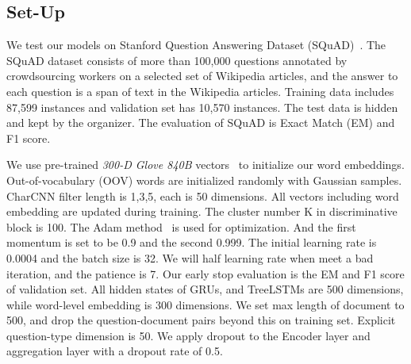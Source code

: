 \documentclass{article}
\begin{document}
\subsection{Set-Up}
We test our models on Stanford Question Answering Dataset (SQuAD)~\citep{rajpurkar2016squad}. The SQuAD dataset consists of more than 100,000 questions annotated by crowdsourcing workers on a selected set of Wikipedia articles, and the answer to each question is a span of text in the  Wikipedia articles. Training data includes 87,599 instances and validation set has 10,570 instances. The test data is hidden and kept by the organizer. The evaluation of SQuAD is Exact Match (EM) and F1 score.


We use pre-trained \textit{300-D Glove 840B} vectors~\citep{pennington2014glove} to initialize our word embeddings. Out-of-vocabulary (OOV) words are initialized randomly with Gaussian samples. CharCNN filter length is 1,3,5, each is 50 dimensions. All vectors including word embedding are updated during training. The cluster number K in discriminative block is 100. The Adam method~\citep{Kingma2014AdamAM} is used for optimization. And the first momentum is set to be 0.9 and the second 0.999. The initial learning rate is 0.0004 and the batch size is 32. We will half learning rate when meet a bad iteration, and the patience is 7. Our early stop evaluation is the EM and F1 score of validation set. All hidden states of GRUs, and TreeLSTMs are 500 dimensions, while word-level embedding  is 300 dimensions. We set max length of document to 500, and drop the question-document pairs beyond this on training set. Explicit question-type dimension  is 50. We apply dropout to the Encoder layer and aggregation layer with a dropout rate of 0.5.   
\end{document}

